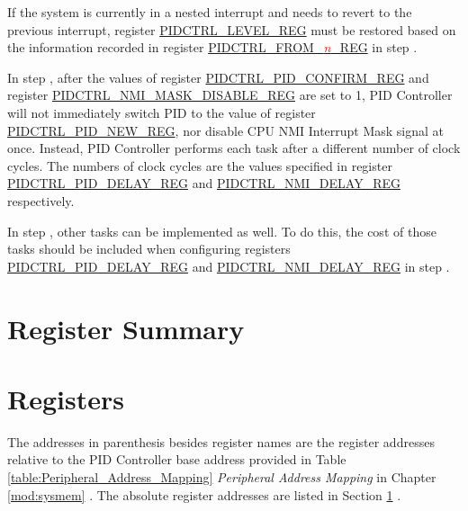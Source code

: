 \documentclass[main\_\_EN.tex]{subfiles}
\begin{document}
If the system is currently in a nested interrupt and needs to revert to the previous interrupt, register \hyperref[regdesc:PIDCTRLLEVELREG]{PIDCTRL\_LEVEL\_REG} must be restored based on the information recorded in register \hyperref[regdesc:PIDCTRLFROMnREG]{PIDCTRL\_FROM\_\textcolor{red}{\it{n}}\_REG} in step .

In step , after the values of register \hyperref[regdesc:PIDCTRLPIDCONFIRMREG]{PIDCTRL\_PID\_CONFIRM\_REG} and register \hyperref[regdesc:PIDCTRLNMIMASKDISABLEREG]{PIDCTRL\_NMI\_MASK\_DISABLE\_REG} are set to 1, PID Controller will not immediately switch PID to the value of register \hyperref[regdesc:PIDCTRLPIDNEWREG]{PIDCTRL\_PID\_NEW\_REG}, nor disable CPU NMI Interrupt Mask signal at once. Instead, PID Controller performs each task after a different number of clock cycles. The numbers of clock cycles are the values specified in register \hyperref[regdesc:PIDCTRLPIDDELAYREG]{PIDCTRL\_PID\_DELAY\_REG} and \hyperref[regdesc:PIDCTRLNMIDELAYREG]{PIDCTRL\_NMI\_DELAY\_REG} respectively.

In step , other tasks can be implemented as well.
To do this, the cost of those tasks should be included when configuring registers \hyperref[regdesc:PIDCTRLPIDDELAYREG]{PIDCTRL\_PID\_DELAY\_REG} and \hyperref[regdesc:PIDCTRLNMIDELAYREG]{PIDCTRL\_NMI\_DELAY\_REG} in step .

\hypertarget{pidctrl-reg-summ}{}
\section{Register Summary}\label{sec:pidctrl-reg-summ}



\section{Registers}

The addresses in parenthesis besides register names are the register addresses relative to the PID Controller base address provided in Table \ref{table:Peripheral_Address_Mapping} \textit{Peripheral Address Mapping} in Chapter \ref{mod:sysmem} \textit{}. The absolute register addresses are listed in Section \ref{sec:pidctrl-reg-summ} \textit{}. 


\end{document}
